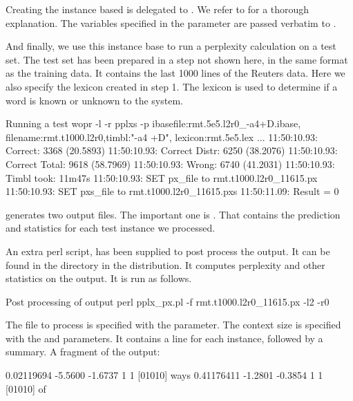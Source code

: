 \documentclass[a4paper,10pt,twoside]{report}
\begin{document}
Creating the instance based is delegated to \Timbl{}. We refer to
\cite{Daelemans+09} for a thorough explanation. The variables
specified in the  parameter are passed verbatim to \Timbl{}.


And finally, we use this instance base to run a perplexity calculation
on a test set. The test set has been prepared in a step not shown
here, in the same format as the training data. It contains the last
\num{1000} lines of the Reuters data. Here we also specify the lexicon
created in step \textsf{1}. The lexicon is used to determine if a word
is known or unknown to the system.

\begin{bash}{Running a test}
wopr -l -r pplxs -p ibasefile:rmt.5e5.l2r0_-a4+D.ibase,
                    filename:rmt.t1000.l2r0,timbl:"-a4 +D",
                    lexicon:rmt.5e5.lex
...
11:50:10.93:  Correct:       3368 (20.5893)
11:50:10.93:  Correct Distr: 6250 (38.2076)
11:50:10.93:  Correct Total: 9618 (58.7969)
11:50:10.93:  Wrong:         6740 (41.2031)
11:50:10.93:  Timbl took: 11m47s
11:50:10.93:  SET px_file to rmt.t1000.l2r0_11615.px
11:50:10.93:  SET pxs_file to rmt.t1000.l2r0_11615.pxs
11:50:11.09: Result = 0
\end{bash}

\Wopr{} generates two output files. The important one is
. That contains the prediction and
statistics for each test instance we processed.

An extra perl script,  has been supplied to post
process the output. It can be found in the  directory in the
\wopr{} distribution. It computes perplexity and other statistics on
the output. It is run as follows.

\begin{bash}{Post processing of \wopr{} output}
perl pplx_px.pl -f rmt.t1000.l2r0_11615.px -l2 -r0
\end{bash}

The file to process is specified with the  parameter. The
context size is specified with the  and 
parameters. It contains a line for each instance, followed by a
summary. A fragment of the output:

\begin{wout}{}
0.02119694  -5.5600  -1.6737  1 1 [01010] ways
0.41176411  -1.2801  -0.3854  1 1 [01010] of
\end{wout}
\end{document}

